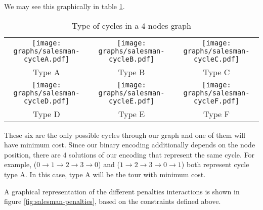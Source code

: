 We may see this graphically in table \ref{tbl:salesman-cycles}.

\begin{table}[H]
	\centering
	\begin{tabular}{ccc}		
		\texttt{[image: graphs/salesman-cycleA.pdf]} &
		\texttt{[image: graphs/salesman-cycleB.pdf]} &
		\texttt{[image: graphs/salesman-cycleC.pdf]} \\
		
		Type A & Type B & Type C \\
		
		\texttt{[image: graphs/salesman-cycleD.pdf]} &
		\texttt{[image: graphs/salesman-cycleE.pdf]} &
		\texttt{[image: graphs/salesman-cycleF.pdf]} \\
		
		Type D & Type E & Type F \\
	\end{tabular}
	\caption{Type of cycles in a $4$-nodes graph}
	\label{tbl:salesman-cycles}
\end{table}

These six are the only possible cycles through our graph and one of them will have minimum cost. Since our binary encoding additionally depends on the node position, there are $4$ solutions of our encoding that represent the same cycle. For example, ($0 \rightarrow 1 \rightarrow 2 \rightarrow 3 \rightarrow 0$) and ($1 \rightarrow 2 \rightarrow 3 \rightarrow 0 \rightarrow 1$) both represent cycle type A. In this case, type A will be the tour with minimum cost.

A graphical representation of the different penalties interactions is shown in figure \ref{fig:salesman-penalties}, based on the constraints defined above.

